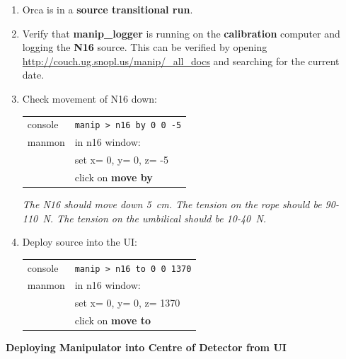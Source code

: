 \documentclass[10pt]{article}
\begin{document}
\begin{enumerate}
\item \CheckBox[name=n16d12]{} Orca is in a {\bf source transitional run}.
\item \CheckBox[name=n16d13]{} Verify that {\bf manip\_logger} is running on the {\bf calibration} computer and logging the {\bf N16} source. This can be verified by opening \url{http://couch.ug.snopl.us/manip/_all_docs} and searching for the current date.
\item \CheckBox[name=n16d14]{} Check movement of N16 down:
	\begin{center}
	\begin{tabular}{|l|l|}
	\hline
	console & \verb+manip > n16 by 0 0 -5+ \\
	manmon & in n16 window: \\
	& set x= 0, y= 0, z= -5 \\
	& click on {\bf move by} \\
	\hline
	\end{tabular}
	\end{center}
{\it The N16 should move down 5~cm. The tension on the rope should be 90-110~N. The tension on the umbilical should be 10-40~N.}
\item \CheckBox[name=n16d15]{} Deploy source into the UI:
	\begin{center}
	\begin{tabular}{|l|l|}
	\hline
	console & \verb+manip > n16 to 0 0 1370+ \\
	manmon & in n16 window: \\
	& set x= 0, y= 0, z= 1370 \\
	& click on {\bf move to} \\
	\hline
	\end{tabular}
	\end{center}
\end{enumerate}

{\bf Deploying Manipulator into Centre of Detector from UI}
	
\end{document}
